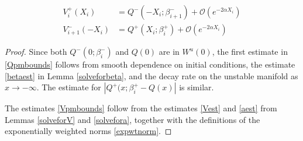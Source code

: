 \documentclass[thesis.tex]{subfiles}
\begin{document}
\begin{lemma}
\begin{enumerate}[(i)]
\begin{equation}
\begin{aligned}
V_i^+(X_i) &= Q^-(-X_i; \beta_{i+1}^-) + \mathcal{O}(e^{-2 \alpha X_i}) \\
V_{i+1}^-(-X_i) &= Q^+(X_i; \beta_i^+) + \mathcal{O}(e^{-2 \alpha X_i})
\end{aligned}
\end{equation}
\end{enumerate}
\begin{proof}
Since both $Q^-(0; \beta_i^-)$ and $Q(0)$ are in $W^u(0)$, the first estimate in \eqref{Qpmbounds} follows from smooth dependence on initial conditions, the estimate \eqref{betaest} in Lemma \ref{solveforbeta},  and the decay rate on the unstable manifold as $x \rightarrow -\infty$. The estimate for $|Q^+(x; \beta_i^+ - Q(x)|$ is similar.

The estimates \eqref{Vpmbounds} follow from the estimates \eqref{Vest} and \eqref{aest} from Lemmas \ref{solveforV} and \ref{solvefora}, together with the definitions of the exponentially weighted norms \eqref{expwtnorm}.


\end{proof}
\end{lemma}
\end{document}
